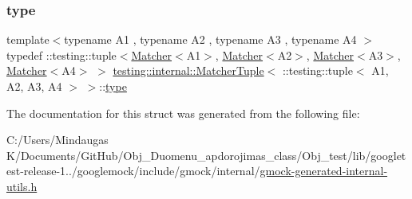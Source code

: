 \subsubsection{\texorpdfstring{type}{type}}
{\footnotesize\ttfamily template$<$typename A1 , typename A2 , typename A3 , typename A4 $>$ \\
typedef \+::testing\+::tuple$<$\mbox{\hyperlink{classtesting_1_1_matcher}{Matcher}}$<$A1$>$, \mbox{\hyperlink{classtesting_1_1_matcher}{Matcher}}$<$A2$>$, \mbox{\hyperlink{classtesting_1_1_matcher}{Matcher}}$<$A3$>$, \mbox{\hyperlink{classtesting_1_1_matcher}{Matcher}}$<$A4$>$ $>$ \mbox{\hyperlink{structtesting_1_1internal_1_1_matcher_tuple}{testing\+::internal\+::\+Matcher\+Tuple}}$<$ \+::testing\+::tuple$<$ A1, A2, A3, A4 $>$ $>$\+::\mbox{\hyperlink{structtesting_1_1internal_1_1_matcher_tuple_3_01_1_1testing_1_1tuple_3_01_a1_00_01_a2_00_01_a3_00_01_a4_01_4_01_4_afa578cadfc6b4725920b115d4f7633df}{type}}}



The documentation for this struct was generated from the following file\+:\begin{DoxyCompactItemize}
\item 
C\+:/\+Users/\+Mindaugas K/\+Documents/\+Git\+Hub/\+Obj\+\_\+\+Duomenu\+\_\+apdorojimas\+\_\+class/\+Obj\+\_\+test/lib/googletest-\/release-\/1../googlemock/include/gmock/internal/\mbox{\hyperlink{gmock-generated-internal-utils_8h}{gmock-\/generated-\/internal-\/utils.\+h}}\end{DoxyCompactItemize}

